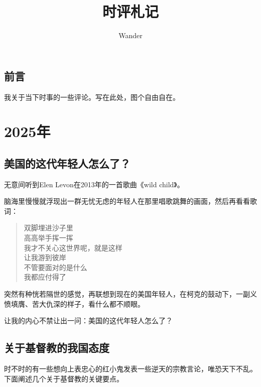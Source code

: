 \documentclass[12pt,oneside]{book}
\title{时评札记}
\author{Wander}
\newenvironment{shici}{%
\begin{verse}%
\centering\large\hspace{12pt}}%
{\end{verse}}
\begin{document}
\makemytitle



\frontmatter 
{}
\chapter*{前言}
我关于当下时事的一些评论。写在此处，图个自由自在。



\setcounter{tocdepth}{2}    
\tableofcontents


\mainmatter


\part{2025年}
\chapter{美国的这代年轻人怎么了？}
无意间听到Elen Levon在2013年的一首歌曲《wild child》。

脑海里慢慢就浮现出一群无忧无虑的年轻人在那里唱歌跳舞的画面，然后再看看歌词：

\begin{shici}
双脚埋进沙子里\\
高高举手挥一挥\\
我才不关心这世界呢，就是这样\\
让我游到彼岸\\
不管要面对的是什么\\
我都应付得了\\
\end{shici}

突然有种恍若隔世的感觉，再联想到现在的美国年轻人，在柯克的鼓动下，一副义愤填膺、苦大仇深的样子，看什么都不顺眼。

让我的内心不禁让出一问：美国的这代年轻人怎么了？

\chapter{关于基督教的我国态度}
时不时的有一些想向上表忠心的红小鬼发表一些逆天的宗教言论，唯恐天下不乱。下面阐述几个关于基督教的关键要点。
\end{document}

